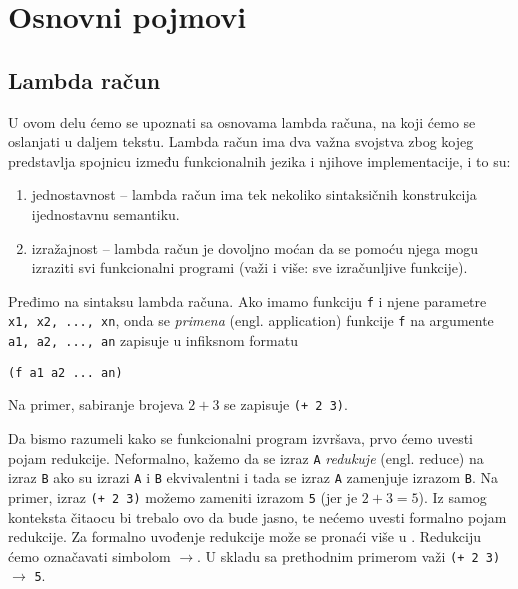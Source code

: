\section{Osnovni pojmovi}
\label{sec:osnovni pojmovi}

\subsection{Lambda račun}
\label{subsec:lambda racun}

U ovom delu ćemo se upoznati sa osnovama lambda računa, na koji ćemo se oslanjati u daljem tekstu. Lambda račun ima dva važna svojstva zbog kojeg predstavlja spojnicu između funkcionalnih jezika i njihove implementacije, i to su:
\begin{enumerate}
	\item jednostavnost -- lambda račun ima tek nekoliko sintaksičnih konstrukcija ijednostavnu semantiku.
	\item izražajnost -- lambda račun je dovoljno moćan da se pomoću njega mogu izraziti svi funkcionalni programi (važi i više: sve izračunljive funkcije).
\end{enumerate}

Pređimo na sintaksu lambda računa. Ako imamo funkciju \verb|f| i njene parametre \verb|x1, x2, ..., xn|, onda se \textit{primena} (engl. application) funkcije \verb|f| na argumente \verb|a1, a2, ..., an| zapisuje u infiksnom formatu
\begin{center}
	\verb|(f a1 a2 ... an)|
\end{center}
Na primer, sabiranje brojeva $2+3$ se zapisuje \verb|(+ 2 3)|.

Da bismo razumeli kako se funkcionalni program izvršava, prvo ćemo uvesti pojam redukcije. Neformalno, kažemo da se izraz \verb|A| \textit{redukuje} (engl. reduce) na izraz \verb|B| ako su izrazi \verb|A| i \verb|B| ekvivalentni i tada se izraz \verb|A| zamenjuje izrazom \verb|B|. Na primer, izraz \verb|(+ 2 3)| možemo zameniti izrazom \verb|5| (jer je $2+3=5$). Iz samog konteksta čitaocu bi trebalo ovo da bude jasno, te nećemo uvesti formalno pojam redukcije. Za formalno uvođenje redukcije može se pronaći više u \cite{FoundationsofFunctionalProgramming}. Redukciju ćemo označavati simbolom $\rightarrow$. U skladu sa prethodnim primerom važi \verb|(+ 2 3)| $\rightarrow$ \verb|5|.
